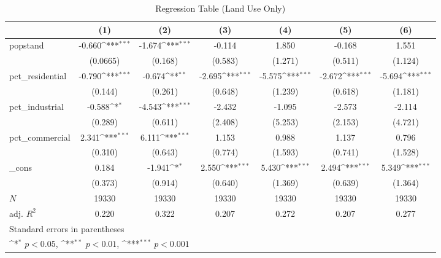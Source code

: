 \begin{table}[htbp]\centering
\def\sym#1{\ifmmode^{#1}\else\(^{#1}\)\fi}
\caption{Regression Table (Land Use Only)\label{tab1}}
\begin{tabular}{l*{6}{c}}
\toprule
            &\multicolumn{1}{c}{(1)}         &\multicolumn{1}{c}{(2)}         &\multicolumn{1}{c}{(3)}         &\multicolumn{1}{c}{(4)}         &\multicolumn{1}{c}{(5)}         &\multicolumn{1}{c}{(6)}         \\
\midrule
popstand    &      -0.660\sym{***}&      -1.674\sym{***}&      -0.114         &       1.850         &      -0.168         &       1.551         \\
            &    (0.0665)         &     (0.168)         &     (0.583)         &     (1.271)         &     (0.511)         &     (1.124)         \\
\addlinespace
pct\_residential&      -0.790\sym{***}&      -0.674\sym{**} &      -2.695\sym{***}&      -5.575\sym{***}&      -2.672\sym{***}&      -5.694\sym{***}\\
            &     (0.144)         &     (0.261)         &     (0.648)         &     (1.239)         &     (0.618)         &     (1.181)         \\
\addlinespace
pct\_industrial&      -0.588\sym{*}  &      -4.543\sym{***}&      -2.432         &      -1.095         &      -2.573         &      -2.114         \\
            &     (0.289)         &     (0.611)         &     (2.408)         &     (5.253)         &     (2.153)         &     (4.721)         \\
\addlinespace
pct\_commercial&       2.341\sym{***}&       6.111\sym{***}&       1.153         &       0.988         &       1.137         &       0.796         \\
            &     (0.310)         &     (0.643)         &     (0.774)         &     (1.593)         &     (0.741)         &     (1.528)         \\
\addlinespace
\_cons      &       0.184         &      -1.941\sym{*}  &       2.550\sym{***}&       5.430\sym{***}&       2.494\sym{***}&       5.349\sym{***}\\
            &     (0.373)         &     (0.914)         &     (0.640)         &     (1.369)         &     (0.639)         &     (1.364)         \\
\midrule
\(N\)       &       19330         &       19330         &       19330         &       19330         &       19330         &       19330         \\
adj. \(R^{2}\)&       0.220         &       0.322         &       0.207         &       0.272         &       0.207         &       0.277         \\
\bottomrule
\multicolumn{7}{l}{\footnotesize Standard errors in parentheses}\\
\multicolumn{7}{l}{\footnotesize \sym{*} \(p<0.05\), \sym{**} \(p<0.01\), \sym{***} \(p<0.001\)}\\
\end{tabular}
\end{table}
